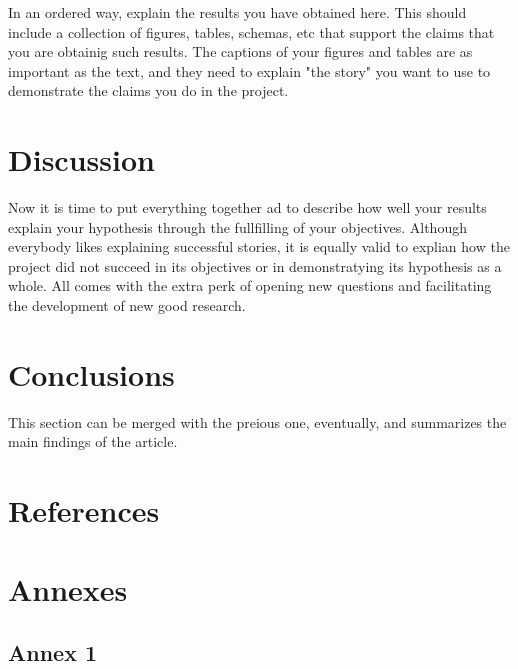 \documentclass[12pt,onecolumn]{article}
\begin{document}
In an ordered way, explain the results you have obtained here. This should include a collection of figures, tables, schemas, etc that support the claims that you are obtainig such results. The captions of your figures and tables are as important as the text, and they need to explain "the story" you want to use to demonstrate the claims you do in the project.



\clearpage
\section{Discussion}

Now it is time to put everything together ad to describe how well your results explain your hypothesis through the fullfilling of your objectives. Although everybody likes explaining successful stories, it is equally valid to explian how the project did not succeed in its objectives or in demonstratying its hypothesis as a whole. All comes with the extra perk of opening new questions and facilitating the development of new good research.


\clearpage
\section{Conclusions}

This section can be merged with the preious one, eventually, and summarizes the main findings of the article.


\clearpage
\section{References}




\clearpage

\section{Annexes}
\subsection{Annex 1}
\end{document}
